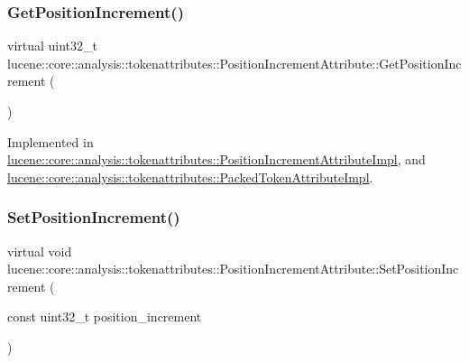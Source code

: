 \subsubsection{\texorpdfstring{Get\+Position\+Increment()}{GetPositionIncrement()}}
{\footnotesize\ttfamily virtual uint32\+\_\+t lucene\+::core\+::analysis\+::tokenattributes\+::\+Position\+Increment\+Attribute\+::\+Get\+Position\+Increment (\begin{DoxyParamCaption}{ }\end{DoxyParamCaption})\hspace{0.3cm}{\ttfamily [pure virtual]}}



Implemented in \mbox{\hyperlink{classlucene_1_1core_1_1analysis_1_1tokenattributes_1_1PositionIncrementAttributeImpl_aed9c6939240be709472fff07ea8f7059}{lucene\+::core\+::analysis\+::tokenattributes\+::\+Position\+Increment\+Attribute\+Impl}}, and \mbox{\hyperlink{classlucene_1_1core_1_1analysis_1_1tokenattributes_1_1PackedTokenAttributeImpl_aeeb6d5e17fb510c402e36d50e39bb9fb}{lucene\+::core\+::analysis\+::tokenattributes\+::\+Packed\+Token\+Attribute\+Impl}}.

\mbox{\label{classlucene_1_1core_1_1analysis_1_1tokenattributes_1_1PositionIncrementAttribute_a7d012852b01e0b16da72a911a90266b7}} 
\subsubsection{\texorpdfstring{Set\+Position\+Increment()}{SetPositionIncrement()}}
{\footnotesize\ttfamily virtual void lucene\+::core\+::analysis\+::tokenattributes\+::\+Position\+Increment\+Attribute\+::\+Set\+Position\+Increment (\begin{DoxyParamCaption}\item[{const uint32\+\_\+t}]{position\+\_\+increment }\end{DoxyParamCaption})\hspace{0.3cm}{\ttfamily [pure virtual]}}



